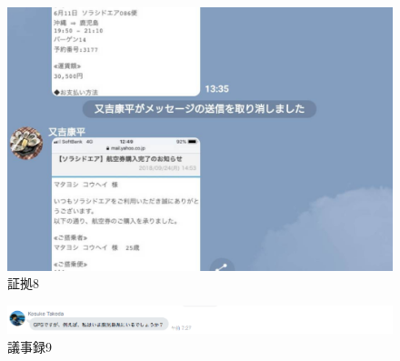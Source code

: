 \begin{figure}[H]
  \centering
  \includegraphics[clip,scale=0.2]{./section/Taira/figures/fig8}
  \caption{証拠8}
\label{fig8}
\end{figure}

\begin{figure}[H]
  \centering
  \includegraphics[clip,scale=0.5]{./section/Taira/figures/giji9}
  \caption{議事録9}
\label{giji9}
\end{figure}

